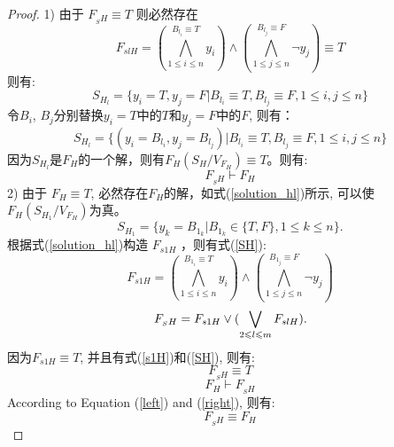 \begin{proof}

1) 由于 $F_{_SH} \equiv T$ 则必然存在
\begin{equation}
F_{slH}=
(\bigwedge_{1\leqslant i\leqslant n}^{B_{l_i}\equiv T}y_{i})\wedge
(\bigwedge_{1\leqslant j\leqslant n}^{B_{l_j}\equiv F}\neg y_{j}) \equiv T
\end{equation}
则有:
\begin{equation}
S_{H_l}=\{y_{i}=T,y_{j}=F|B_{l_i}\equiv T, B_{l_j}\equiv F, 1\leqslant i, j\leqslant n \}
\end{equation}
令$B_i$, $B_j$分别替换$y_{i}=T$中的$T$和$y_{j}=F$中的$F$, 则有：
\begin{equation}
S_{H_l}=\{(y_i=B_{l_i},y_j=B_{l_j})|B_{l_i}\equiv T, B_{l_j}\equiv F, 1\leqslant i, j\leqslant n\}
\end{equation}
因为$S_{H_l}$是$F_H$的一个解，则有$F_H(S_H/V_{F_H})\equiv T$。则有:
\begin{equation}\label{left}
 F_{_SH} \vdash F_H
\end{equation}
2) 由于 $F_H\equiv T$, 必然存在$F_H$的解，如式(\ref{solution_hl})所示, 可以使$F_H(S_{H_1}/V_{F_H})$为真。
\begin{equation}\label{solution_hl}
S_{H_1}=\{y_k=B_{1_k}|B_{1_k} \in \{T,F\}, 1\leqslant k\leqslant n\}.
\end{equation}
根据式(\ref{solution_hl})构造 $F_{s1H}$ ，则有式(\ref{SH}):
\begin{equation}\label{s1H}
F_{s1H}=
(\bigwedge_{1\leqslant i\leqslant n}^{B_{1_i}\equiv T}y_{i})\wedge
(\bigwedge_{1\leqslant j\leqslant n}^{B_{1_j}\equiv F}\neg y_{j})
\end{equation}
\begin{equation}\label{SH}
F_{_SH} =F_ {s1H} \vee (\bigvee_{2\leqslant l\leqslant m}F_{slH}). \\
\end{equation}
因为$F_{s1H} \equiv T$, 并且有式(\ref{s1H})和(\ref{SH}), 则有:
\begin{equation}
F_{_SH}  \equiv T
\end{equation}
\begin{equation}\label{right}
F_H \vdash F_{_SH}
\end{equation}
According to Equation (\ref{left}) and (\ref{right}), 则有:
\begin{equation}
 F_{_SH} \equiv F_H
\end{equation}
\end{proof}

